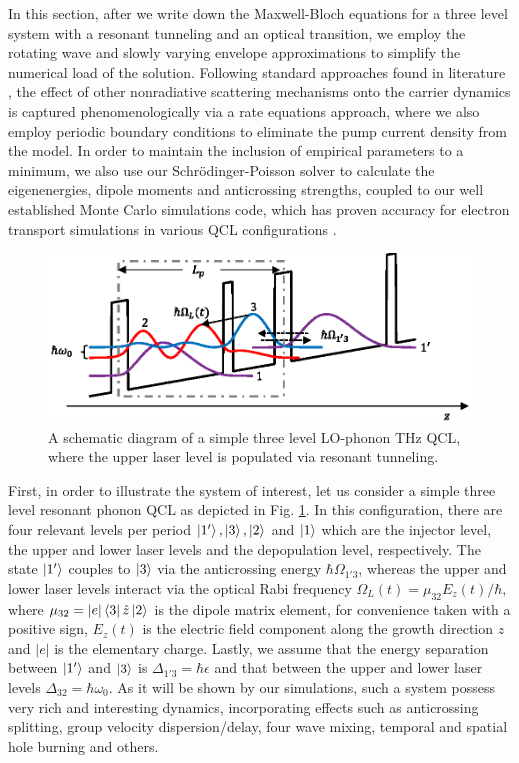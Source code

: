 \documentclass[twocolumn,secnumarabic,amssymb, nobibnotes, aps, prd]{revtex4-1}
\begin{document}
In this section, after we write down the Maxwell-Bloch equations for a three level system with a resonant tunneling and an optical transition, we employ the rotating wave and slowly varying envelope approximations to simplify the numerical load of the solution. Following standard approaches found in literature \cite{wang2015active,callebaut2005importance}, the effect of other nonradiative scattering mechanisms onto the carrier dynamics is captured phenomenologically via a  rate equations approach, where we also employ periodic boundary conditions to eliminate the pump current density from the model. In order to maintain the inclusion of empirical parameters to a minimum, we also use our Schr{\"o}dinger-Poisson solver to calculate the eigenenergies, dipole moments and anticrossing strengths, coupled to our well established Monte Carlo simulations code, which has proven accuracy for electron transport simulations in various QCL configurations \cite{jirauschek2007comparative,jirauschek2009monte,jirauschek2010monte}.
\begin{figure}[h!]
	\centering
	\includegraphics[scale=0.7]{figs/TOYMODEL.eps}
	\caption{A schematic diagram of a simple three level LO-phonon THz QCL, where the upper laser level is populated via resonant tunneling.} \label{fig:img01}
\end{figure}

First, in order to illustrate the system of interest, let us consider a simple three level resonant phonon QCL as depicted in Fig. \ref{fig:img01}. In this configuration, there are four relevant levels per period $\Ket{1'}, \Ket{3}, \Ket{2} $ and $\Ket{1}$ which are the injector level, the upper and lower laser levels and the depopulation level, respectively. The state $\Ket{1'}$ couples to $\Ket{3}$ via the anticrossing energy $\hbar\Omega_{1'3}$, whereas the upper and lower laser levels interact via the optical Rabi frequency $\Omega_L(t)= \mu_{32}E_z(t)/\hbar$, where $\mu_{32} = |e| \Bra{3}\hat{z} \Ket{2}$ is the dipole matrix element, for convenience taken with a positive sign, $E_z(t)$ is the electric field component along the growth direction $z$ and $|e|$ is the elementary charge. Lastly, we assume that the energy separation between $\Ket{1'}$ and $\Ket{3}$ is $\Delta_{1'3} = \hbar \epsilon$ and that between the upper and lower laser levels $\Delta_{32} = \hbar \omega_0$. As it will be shown by our simulations, such a system possess very rich and interesting dynamics, incorporating effects such as anticrossing splitting, group velocity dispersion/delay, four wave mixing, temporal and spatial hole burning and others.
\end{document}
